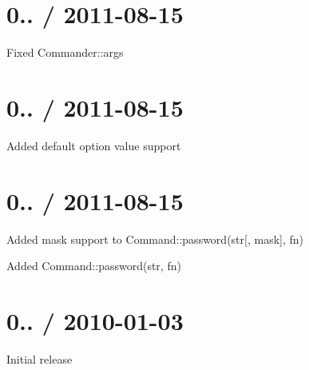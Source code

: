 \section*{0.. / 2011-\/08-\/15 }


\begin{DoxyItemize}
\item Fixed {\ttfamily Commander\+::args}
\end{DoxyItemize}

\section*{0.. / 2011-\/08-\/15 }


\begin{DoxyItemize}
\item Added default option value support
\end{DoxyItemize}

\section*{0.. / 2011-\/08-\/15 }


\begin{DoxyItemize}
\item Added mask support to {\ttfamily Command\+::password(str\mbox{[}, mask\mbox{]}, fn)}
\item Added {\ttfamily Command\+::password(str, fn)}
\end{DoxyItemize}

\section*{0.. / 2010-\/01-\/03 }


\begin{DoxyItemize}
\item Initial release 
\end{DoxyItemize}